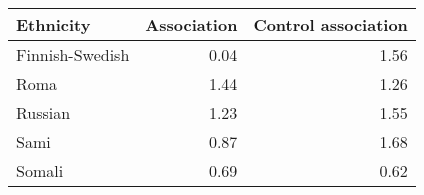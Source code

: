 \begin{tabular}{lrr}
\toprule
      Ethnicity &  Association &  Control association \\
\midrule
Finnish-Swedish &         0.04 &                 1.56 \\
           Roma &         1.44 &                 1.26 \\
        Russian &         1.23 &                 1.55 \\
           Sami &         0.87 &                 1.68 \\
         Somali &         0.69 &                 0.62 \\
\bottomrule
\end{tabular}
